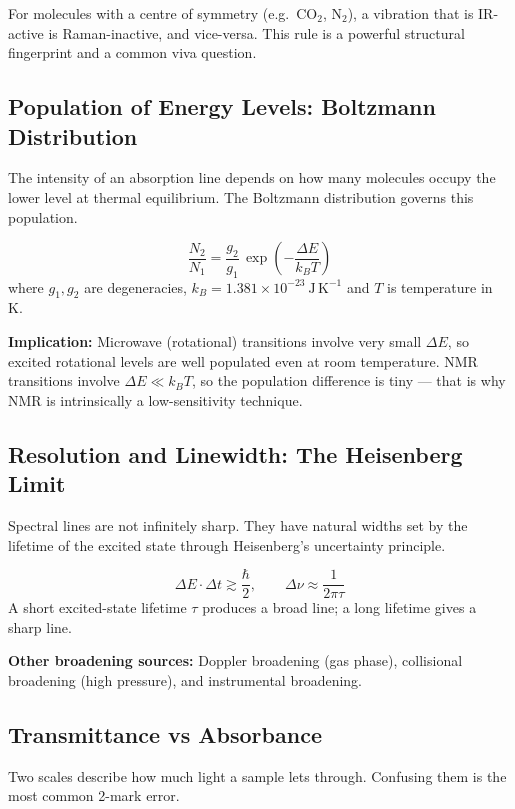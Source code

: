 \documentclass[12pt,a4paper]{article}
\begin{document}
\begin{tcolorbox}[masonbox, title={Mutual Exclusion Principle}]
For molecules with a centre of symmetry (e.g.\ $\mathrm{CO_2}$, $\mathrm{N_2}$), a vibration that is IR-active is Raman-inactive, and vice-versa. This rule is a powerful structural fingerprint and a common viva question.
\end{tcolorbox}

\subsection{Population of Energy Levels: Boltzmann Distribution}
The intensity of an absorption line depends on how many molecules occupy the lower level at thermal equilibrium. The Boltzmann distribution governs this population.

\begin{tcolorbox}[formulabox, title={Boltzmann Population Ratio}]
\[
\frac{N_2}{N_1}=\frac{g_2}{g_1}\,\exp\!\left(-\frac{\Delta E}{k_B T}\right)
\]
where $g_1, g_2$ are degeneracies, $k_B=1.381\times10^{-23}\ \mathrm{J\,K^{-1}}$ and $T$ is temperature in K.
\end{tcolorbox}

\textbf{Implication:} Microwave (rotational) transitions involve very small $\Delta E$, so excited rotational levels are well populated even at room temperature. NMR transitions involve $\Delta E\ll k_BT$, so the population difference is tiny — that is why NMR is intrinsically a low-sensitivity technique.

\subsection{Resolution and Linewidth: The Heisenberg Limit}
Spectral lines are not infinitely sharp. They have natural widths set by the lifetime of the excited state through Heisenberg's uncertainty principle.

\begin{tcolorbox}[formulabox, title={Natural Linewidth}]
\[
\Delta E\cdot\Delta t \gtrsim \frac{\hbar}{2}, \qquad \Delta\nu \approx \frac{1}{2\pi\tau}
\]
A short excited-state lifetime $\tau$ produces a broad line; a long lifetime gives a sharp line.
\end{tcolorbox}

\textbf{Other broadening sources:} Doppler broadening (gas phase), collisional broadening (high pressure), and instrumental broadening.

\subsection{Transmittance vs Absorbance}
Two scales describe how much light a sample lets through. Confusing them is the most common 2-mark error.
\end{document}
